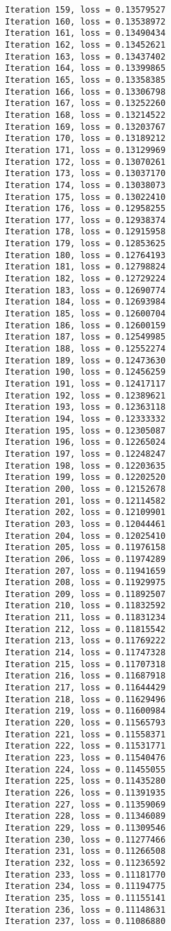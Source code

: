 \documentclass[11pt]{article}
\begin{document}
\begin{Verbatim}[commandchars=\\\{\}]
Iteration 159, loss = 0.13579527
Iteration 160, loss = 0.13538972
Iteration 161, loss = 0.13490434
Iteration 162, loss = 0.13452621
Iteration 163, loss = 0.13437402
Iteration 164, loss = 0.13399865
Iteration 165, loss = 0.13358385
Iteration 166, loss = 0.13306798
Iteration 167, loss = 0.13252260
Iteration 168, loss = 0.13214522
Iteration 169, loss = 0.13203767
Iteration 170, loss = 0.13189212
Iteration 171, loss = 0.13129969
Iteration 172, loss = 0.13070261
Iteration 173, loss = 0.13037170
Iteration 174, loss = 0.13038073
Iteration 175, loss = 0.13022410
Iteration 176, loss = 0.12958255
Iteration 177, loss = 0.12938374
Iteration 178, loss = 0.12915958
Iteration 179, loss = 0.12853625
Iteration 180, loss = 0.12764193
Iteration 181, loss = 0.12798824
Iteration 182, loss = 0.12729224
Iteration 183, loss = 0.12690774
Iteration 184, loss = 0.12693984
Iteration 185, loss = 0.12600704
Iteration 186, loss = 0.12600159
Iteration 187, loss = 0.12549985
Iteration 188, loss = 0.12552274
Iteration 189, loss = 0.12473630
Iteration 190, loss = 0.12456259
Iteration 191, loss = 0.12417117
Iteration 192, loss = 0.12389621
Iteration 193, loss = 0.12363118
Iteration 194, loss = 0.12333332
Iteration 195, loss = 0.12305087
Iteration 196, loss = 0.12265024
Iteration 197, loss = 0.12248247
Iteration 198, loss = 0.12203635
Iteration 199, loss = 0.12202520
Iteration 200, loss = 0.12152678
Iteration 201, loss = 0.12114582
Iteration 202, loss = 0.12109901
Iteration 203, loss = 0.12044461
Iteration 204, loss = 0.12025410
Iteration 205, loss = 0.11976158
Iteration 206, loss = 0.11974289
Iteration 207, loss = 0.11941659
Iteration 208, loss = 0.11929975
Iteration 209, loss = 0.11892507
Iteration 210, loss = 0.11832592
Iteration 211, loss = 0.11831234
Iteration 212, loss = 0.11815542
Iteration 213, loss = 0.11769222
Iteration 214, loss = 0.11747328
Iteration 215, loss = 0.11707318
Iteration 216, loss = 0.11687918
Iteration 217, loss = 0.11644429
Iteration 218, loss = 0.11629496
Iteration 219, loss = 0.11600984
Iteration 220, loss = 0.11565793
Iteration 221, loss = 0.11558371
Iteration 222, loss = 0.11531771
Iteration 223, loss = 0.11540476
Iteration 224, loss = 0.11455055
Iteration 225, loss = 0.11435280
Iteration 226, loss = 0.11391935
Iteration 227, loss = 0.11359069
Iteration 228, loss = 0.11346089
Iteration 229, loss = 0.11309546
Iteration 230, loss = 0.11277466
Iteration 231, loss = 0.11266508
Iteration 232, loss = 0.11236592
Iteration 233, loss = 0.11181770
Iteration 234, loss = 0.11194775
Iteration 235, loss = 0.11155141
Iteration 236, loss = 0.11148631
Iteration 237, loss = 0.11086880

\end{Verbatim}
\end{document}
